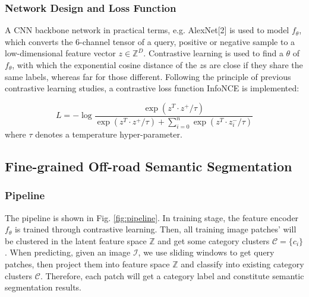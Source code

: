 \documentclass[letterpaper, 10 pt, conference]{ieeeconf}  %
\begin{document}
\subsubsection{Network Design and Loss Function}

A CNN backbone network in practical terms, e.g. AlexNet[2] is used to model $f_{\theta}$, which converts the 6-channel tensor of a query, positive or negative sample to a low-dimensional feature vector $z\in \mathbb{Z}^D$.
Contrastive learning is used to find a $\theta$ of $f_{\theta}$, with which the exponential cosine distance of the $z$s are close if they share the same labels, whereas far for those different.
Following the principle of previous contrastive learning studies, a contrastive loss function InfoNCE\cite{oord2018representation} is implemented:

\begin{equation}\label{loss}
L=-\log {\dfrac{\exp (z^T \cdot z^+/\tau)}{\exp (z^T \cdot z^+/\tau)+\sum_{i=0}^{n}{\exp (z^T \cdot z_i^-/\tau)}}}
\end{equation}
where $\tau$ denotes a temperature hyper-parameter.

\subsection{Fine-grained Off-road Semantic Segmentation}
\subsubsection{Pipeline}
The pipeline is shown in Fig. \ref{fig:pipeline}. In training stage, the feature encoder $f_\theta$ is trained through contrastive learning. Then, all training image patches' will be clustered in the latent feature space $\mathbb{Z}$ and get some category clusters $\mathcal{C}=\{c_i\}$.
When predicting, given an image $\mathcal{I}$, we use sliding windows to get query patches, then project them into feature space $\mathbb{Z}$ and classify into existing category clusters $\mathcal{C}$. Therefore, each patch will get a category label and constitute semantic segmentation results.
\end{document}
